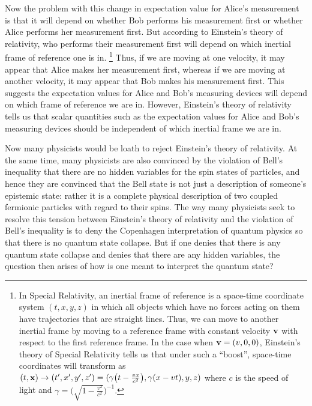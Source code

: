 \documentclass[letter, 12pt]{turabian-thesis}
\theoremstyle{hypothesis}
\let\origfootnote\footnote %
\renewcommand{\footnote}[1]{%
\noindent %
\origfootnote{#1}}
\begin{document}
Now the problem\label{Copenhagenproblem} with this change in expectation value for Alice's measurement is that it will depend on whether Bob performs his measurement first or whether Alice performs her measurement first. But according to Einstein's theory of relativity, who performs their measurement first will depend on which inertial frame of reference one is in.\footnote{In Special Relativity, an inertial frame of reference is a space-time coordinate system $(t, x, y, z)$ in which all objects which have no forces acting on them have trajectories that are straight lines. Thus, we can move to another inertial frame by moving to a reference frame with constant velocity $\vb{v}$ with respect to the first reference frame. In the case when $\vb{v}=(v, 0, 0)$, Einstein's theory of Special Relativity tells us that under such a “boost”, space-time coordinates will transform as $(t,\vb{x})\rightarrow(t',x',y',z')=(\gamma\big(t - \frac{vx}{c^2}\big),\gamma(x-vt),y,z)$ where $c$ is the speed of light and $\gamma=\Big(\sqrt{1-\frac{v^2}{c^2}}\Big)^{-1}.$ } Thus, if we are moving at one velocity, it may appear that Alice makes her measurement first, whereas if we are moving at another velocity, it may appear that Bob makes his measurement first. This suggests the expectation values for Alice and Bob's measuring devices will depend on which frame of reference we are in. However, Einstein's theory of relativity tells us that scalar quantities such as the expectation values for Alice and Bob's measuring devices should be independent of which inertial frame we are in. 

Now many physicists would be loath to reject Einstein's theory of relativity. At the same time, many physicists are also convinced by the violation of Bell's inequality that there are no hidden variables for the spin states of particles, and hence they are convinced that the Bell state is not just a description of someone's epistemic state: rather it is a complete physical description of two coupled fermionic particles with regard to their spins. The way many physicists seek to resolve this tension between Einstein's theory of relativity and the violation of Bell's inequality is to deny the Copenhagen interpretation of quantum physics so that there is no quantum state collapse. But if one denies that there is any quantum state collapse and denies that there are any hidden variables, the question then arises of how is one  meant to interpret the quantum state? 
\end{document}
